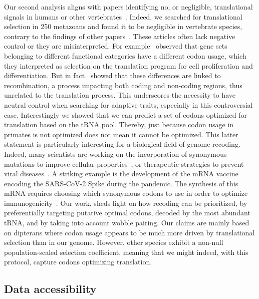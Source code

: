 Our second analysis aligns with papers identifying no, or negligible, translational signals in humans or other vertebrates~\citep{mouchiroud_compositional_1988, kanaya_codon_2001, duret_evolution_2002, pouyet_recombination_2017}. Indeed, we searched for \gls{translational selection} in 250 metazoans and found it to be negligible in vertebrate species, contrary to the findings of other papers~\citep{chamary_hearing_2006, gingold_dual_2014, dhindsa_natural_2020}. These articles often lack negative control or they are misinterpreted. For example~\citet{gingold_dual_2014} observed that gene sets belonging to different functional categories have a different \gls{codon usage}, which they interpreted as selection on the translation program for cell proliferation and differentiation. But in fact~\citet{pouyet_recombination_2017} showed that these differences are linked to recombination, a process impacting both coding and non-coding regions, thus unrelated to the translation process. This underscores the necessity to have neutral control when searching for adaptive traits, especially in this controversial case. Interestingly we showed that we can predict a set of \gls{codon}s optimized for translation based on the \acrshort{tRNA} pool. Thereby, just because \gls{codon usage} in primates is not optimized does not mean it cannot be optimized. This latter statement is particularly interesting for a biological field of genome recoding. Indeed, many scientists are working on the incorporation of \gls{synonymous} mutations to improve cellular properties~\citep{singh_genome_2021}, or therapeutic strategies to prevent viral diseases~\citep{martinez_synonymous_2019}. A striking example is the development of the \acrshort{mRNA} vaccine encoding the SARS-CoV-2 Spike during the pandemic. The synthesis of this \acrshort{mRNA} requires choosing which \gls{synonymous} \gls{codon}s to use in order to optimize immunogenicity~\citep{gimenez-roig_codon_2021, lai_viral_2023, zhang_algorithm_2023}. Our work, sheds light on how recoding can be prioritized, by preferentially targeting putative optimal codons, decoded by the most abundant \acrshort{tRNA}, and by taking into account wobble pairing. Our claims are mainly based on dipterans where \gls{codon usage} appears to be much more driven by translational selection than in our genome. However, other species exhibit a non-null population-scaled selection coefficient, meaning that we might indeed, with this protocol, capture codons optimizing translation.

\subsection{Data accessibility}

